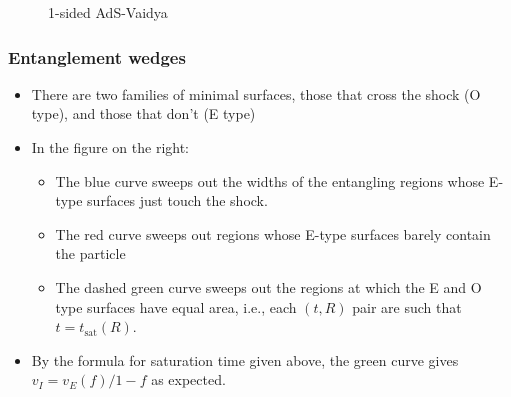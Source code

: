 \documentclass[10pt,aspectratio=169]{beamer}
\begin{document}
\begin{frame}
\begin{minipage}[t]{0.55\linewidth}
\begin{figure}
\begin{center}
    \end{center}
    \caption{1-sided AdS-Vaidya}
    \label{fig:Penrose}
\end{figure}

\end{minipage}

\end{frame}


\begin{frame}
\frametitle{Entanglement wedges}

\begin{minipage}[t]{0.44\linewidth}

\begin{itemize}

\item There are two families of minimal surfaces, those that cross the shock (O type), and those that don't (E type)

\item In the figure on the right:

	\begin{itemize}
	
	\item The blue curve sweeps out the widths of the entangling regions whose 
	E-type surfaces just touch the shock.	
	
	\item The red curve sweeps out regions whose E-type surfaces barely contain the particle
	
	\item The dashed green curve sweeps out the regions at which the E and O type surfaces have equal area, i.e., each $(t, R)$ pair are such that $t = t_{\text{sat}} (R)$.
	
	\end{itemize}
	
\item By the formula for saturation time given above, the green curve gives $v_I = v_E(f)/1-f$ as expected.

\end{itemize}

\end{minipage}\hfill
%
\begin{minipage}[t]{0.55\linewidth}

\begin{figure}
    \begin{center}
    

\end{center}
\end{figure}
\end{minipage}
\end{frame}
\end{document}
